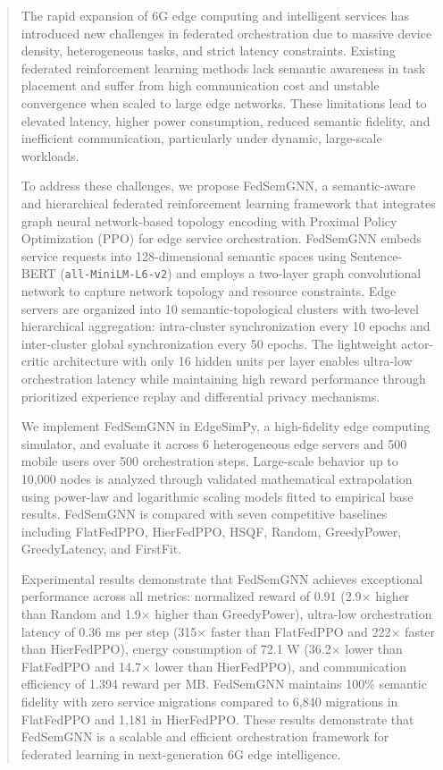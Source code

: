 \begin{abstract}
	The rapid expansion of 6G edge computing and intelligent services has introduced new challenges in federated orchestration due to massive device density, heterogeneous tasks, and strict latency constraints. Existing federated reinforcement learning methods lack semantic awareness in task placement and suffer from high communication cost and unstable convergence when scaled to large edge networks. These limitations lead to elevated latency, higher power consumption, reduced semantic fidelity, and inefficient communication, particularly under dynamic, large-scale workloads.

	To address these challenges, we propose FedSemGNN, a semantic-aware and hierarchical federated reinforcement learning framework that integrates graph neural network-based topology encoding with Proximal Policy Optimization (PPO) for edge service orchestration. FedSemGNN embeds service requests into 128-dimensional semantic spaces using Sentence-BERT (\texttt{all-MiniLM-L6-v2}) and employs a two-layer graph convolutional network to capture network topology and resource constraints. Edge servers are organized into 10 semantic-topological clusters with two-level hierarchical aggregation: intra-cluster synchronization every 10 epochs and inter-cluster global synchronization every 50 epochs. The lightweight actor-critic architecture with only 16 hidden units per layer enables ultra-low orchestration latency while maintaining high reward performance through prioritized experience replay and differential privacy mechanisms.
	
	We implement FedSemGNN in EdgeSimPy, a high-fidelity edge computing simulator, and evaluate it across 6 heterogeneous edge servers and 500 mobile users over 500 orchestration steps. Large-scale behavior up to 10,000 nodes is analyzed through validated mathematical extrapolation using power-law and logarithmic scaling models fitted to empirical base results. FedSemGNN is compared with seven competitive baselines including FlatFedPPO, HierFedPPO, HSQF, Random, GreedyPower, GreedyLatency, and FirstFit.
	
	Experimental results demonstrate that FedSemGNN achieves exceptional performance across all metrics: normalized reward of 0.91 (2.9$\times$ higher than Random and 1.9$\times$ higher than GreedyPower), ultra-low orchestration latency of 0.36 ms per step (315$\times$ faster than FlatFedPPO and 222$\times$ faster than HierFedPPO), energy consumption of 72.1 W (36.2$\times$ lower than FlatFedPPO and 14.7$\times$ lower than HierFedPPO), and communication efficiency of 1.394 reward per MB. FedSemGNN maintains 100\% semantic fidelity with zero service migrations compared to 6,840 migrations in FlatFedPPO and 1,181 in HierFedPPO. These results demonstrate that FedSemGNN is a scalable and efficient orchestration framework for federated learning in next-generation 6G edge intelligence.
\end{abstract}
